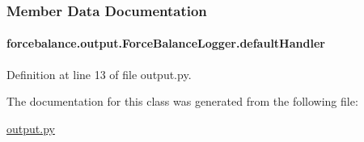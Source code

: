 \subsubsection{Member Data Documentation}
\hypertarget{classforcebalance_1_1output_1_1ForceBalanceLogger_a98390245191cb70e88ef22816959aa2c}{
\paragraph[{default\-Handler}]{\setlength{\rightskip}{0pt plus 5cm}forcebalance.\-output.\-Force\-Balance\-Logger.\-default\-Handler}}\label{classforcebalance_1_1output_1_1ForceBalanceLogger_a98390245191cb70e88ef22816959aa2c}


Definition at line 13 of file output.\-py.



The documentation for this class was generated from the following file\-:\begin{DoxyCompactItemize}
\item 
\hyperlink{output_8py}{output.\-py}\end{DoxyCompactItemize}
